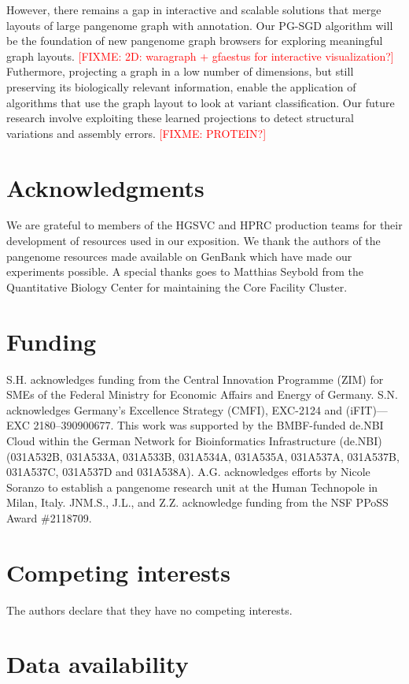 \documentclass{bioinfo}
\theoremstyle{definition}
\newcommand{\red}[1]{{\textcolor{Red}{#1}}}
\newcommand{\FIXME}[1]{\red{[FIXME: #1]}}
\begin{document}
	However, there remains a gap in interactive and scalable solutions that merge layouts of large pangenome graph with annotation.
	Our PG-SGD algorithm will be the foundation of new pangenome graph browsers for exploring meaningful graph layouts.
	\FIXME{2D: waragraph + gfaestus for interactive visualization?}
	Futhermore, projecting a graph in a low number of dimensions, but still preserving its biologically relevant information, enable the application of algorithms that use the graph layout to look at variant classification.
	Our future research involve exploiting these learned projections to detect structural variations and assembly errors.
	\FIXME{PROTEIN?}
	
	
	\section*{Acknowledgments}
	
	We are grateful to members of the HGSVC and HPRC production teams for their development of resources used in our exposition.
	We thank the authors of the pangenome resources made available on GenBank which have made our experiments possible.
	A special thanks goes to Matthias Seybold from the Quantitative Biology Center for maintaining the Core Facility Cluster.
	
	\section*{Funding}
	
	S.H. acknowledges funding from the Central Innovation Programme (ZIM) for SMEs of the Federal Ministry for Economic Affairs and Energy of Germany.
	S.N. acknowledges Germany’s Excellence Strategy (CMFI), EXC-2124 and (iFIT)—EXC 2180–390900677.
	This work was supported by the BMBF-funded de.NBI Cloud within the German Network for Bioinformatics Infrastructure (de.NBI) (031A532B, 031A533A, 031A533B, 031A534A, 031A535A, 031A537A, 031A537B, 031A537C, 031A537D and 031A538A).
	A.G. acknowledges efforts by Nicole Soranzo to establish a pangenome research unit at the Human Technopole in Milan, Italy.
	JNM.S., J.L., and Z.Z. acknowledge funding from the NSF PPoSS Award \#2118709.
	
	\section*{Competing interests}
	The authors declare that they have no competing interests.
	
	\section*{Data availability}
	
\end{document}
